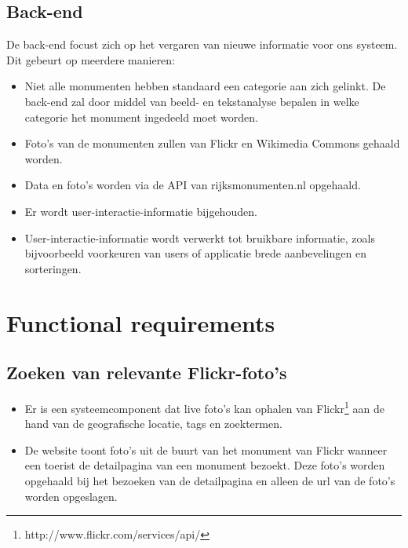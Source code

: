 \documentclass[a4paper,10pt]{article}
\begin{document}
		\subsection{Back-end}
			De back-end focust zich op het vergaren van nieuwe informatie voor ons systeem. Dit gebeurt op meerdere manieren:
			\begin{itemize}
				\item Niet alle monumenten hebben standaard een categorie aan zich gelinkt. De back-end zal door middel van beeld- en tekstanalyse bepalen in welke categorie het monument ingedeeld moet worden.
				\item Foto's van de monumenten zullen van Flickr en Wikimedia Commons gehaald worden.
				\item Data en foto's worden via de API van rijksmonumenten.nl opgehaald.
				\item Er wordt user-interactie-informatie bijgehouden.
				\item User-interactie-informatie wordt verwerkt tot bruikbare informatie, zoals bijvoorbeeld voorkeuren van users of applicatie brede aanbevelingen en sorteringen.
			\end{itemize}
			
		\clearpage
		\section{Functional requirements}
            \subsection{Zoeken van relevante Flickr-foto's}
            \begin{itemize}
                \item Er is een systeemcomponent dat live foto's kan ophalen van Flickr\footnote{http://www.flickr.com/services/api/} aan de hand van de geografische locatie, tags en zoektermen.
                \item De website toont foto's uit de buurt van het monument van Flickr wanneer een toerist de detailpagina van een monument bezoekt. Deze foto's worden opgehaald bij het bezoeken van de detailpagina en alleen de url van de foto's worden opgeslagen.
            \end{itemize}
            
\end{document}
